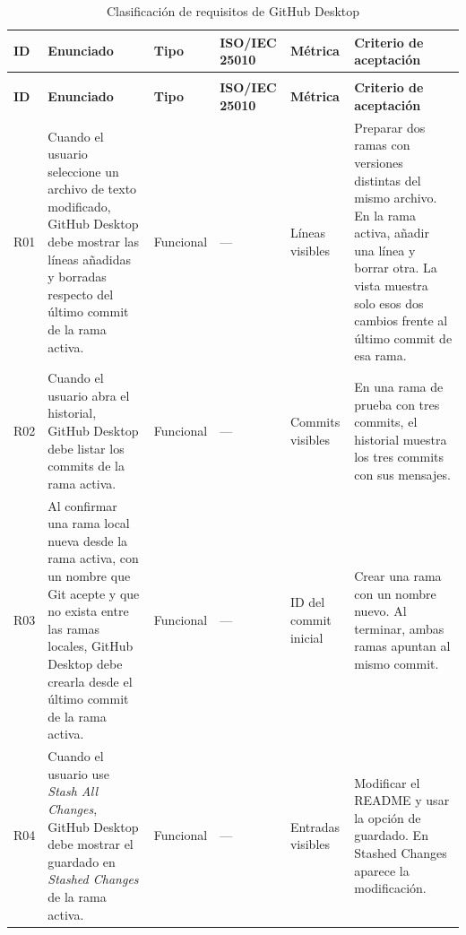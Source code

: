 \documentclass[11pt,a4paper]{article}
\begin{document}
\begingroup
\small
\setlength{\tabcolsep}{3pt}
\setlength{\LTpost}{4pt}
\renewcommand{\arraystretch}{1.08}
\begin{longtable}{@{}
  >{\raggedright\arraybackslash}p{0.85cm}
  >{\raggedright\arraybackslash}p{5.45cm}
  >{\raggedright\arraybackslash}p{1.60cm}
  >{\raggedright\arraybackslash}p{2.55cm}
  >{\raggedright\arraybackslash}p{1.85cm}
  >{\raggedright\arraybackslash}p{3.55cm}
  @{}}
\caption{Clasificación de requisitos de GitHub Desktop}
\label{tab:requisitos}\\
\hline
\textbf{ID} & \textbf{Enunciado} & \textbf{Tipo} &
\textbf{ISO/IEC 25010} & \textbf{Métrica} & \textbf{Criterio de aceptación}\\
\hline
\endfirsthead
\multicolumn{6}{@{}l}{\textbf{Tabla \thetable.} Clasificación de requisitos
(continuación)}\\
\hline
\textbf{ID} & \textbf{Enunciado} & \textbf{Tipo} &
\textbf{ISO/IEC 25010} & \textbf{Métrica} & \textbf{Criterio de aceptación}\\
\hline
\endhead
\endfoot
\hline
\endlastfoot

R01 & Cuando el usuario seleccione un archivo de texto modificado,
GitHub Desktop debe mostrar las líneas añadidas y borradas respecto
del último commit de la rama activa. &
Funcional & --- & Líneas visibles &
Preparar dos ramas con versiones distintas del mismo archivo. En la
rama activa, añadir una línea y borrar otra. La vista muestra solo esos
dos cambios frente al último commit de esa rama.\\
\hline

R02 & Cuando el usuario abra el historial, GitHub Desktop debe listar
los commits de la rama activa. &
Funcional & --- & Commits visibles &
En una rama de prueba con tres commits, el historial muestra los tres
commits con sus mensajes.\\
\hline

R03 & Al confirmar una rama local nueva desde la rama activa, con un
nombre que Git acepte y que no exista entre las ramas locales, GitHub
Desktop debe crearla desde el último commit de la rama activa. &
Funcional & --- & ID del commit inicial &
Crear una rama con un nombre nuevo. Al terminar, ambas ramas apuntan al
mismo commit.\\
\hline

R04 & Cuando el usuario use \textit{Stash All Changes}, GitHub Desktop
debe mostrar el guardado en \textit{Stashed Changes} de la rama activa. &
Funcional & --- & Entradas visibles &
Modificar el README y usar la opción de guardado. En Stashed Changes
aparece la modificación.\\
\hline


\end{longtable}
\end{document}
